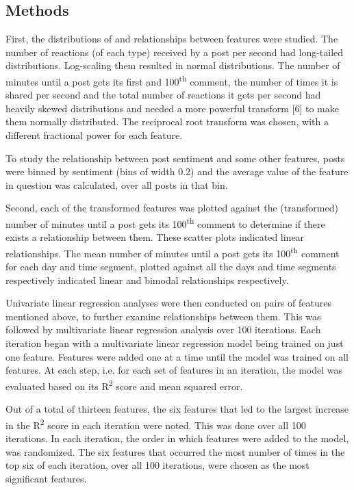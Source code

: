\documentclass[twoside]{article}
\begin{document}
\begin{multicols}{2}
\section{Methods}
First, the distributions of and relationships between features were studied. The number of reactions (of each type) received by a post per second had long-tailed distributions. Log-scaling them resulted in normal distributions. The number of minutes until a post gets its first and 100\textsuperscript{th} comment, the number of times it is shared per second and the total number of reactions it gets per second had heavily skewed distributions and needed a more powerful transform [6] to make them normally distributed. The reciprocal root transform was chosen, with a different fractional power for each feature. 

To study the relationship between post sentiment and some other features, posts were binned by sentiment (bins of width 0.2) and the average value of the feature in question was calculated, over all posts in that bin.

Second, each of the transformed features was plotted against the (transformed) number of minutes until a post gets its 100\textsuperscript{th} comment to determine if there exists a relationship between them. These scatter plots indicated linear relationships. The mean number of minutes until a post gets its 100\textsuperscript{th} comment for each day and time segment, plotted against all the days and time segments respectively indicated linear and bimodal relationships respectively. 

Univariate linear regression analyses were then conducted on pairs of features mentioned above, to further examine relationships between them. This was followed by multivariate linear regression analysis over 100 iterations. Each iteration began with a multivariate linear regression model being trained on just one feature. Features were added one at a time until the model was trained on all features. At each step, i.e. for each set of features in an iteration, the model was evaluated based on its R\textsuperscript{2} score and mean squared error.

Out of a total of thirteen features, the six features that led to the largest increase in the R\textsuperscript{2} score in each iteration were noted. This was done over all 100 iterations. In each iteration, the order in which features were added to the model, was randomized. The six features that occurred the most number of times in the top six of each iteration, over all 100 iterations, were chosen as the most significant features. 


\end{multicols}
\end{document}
